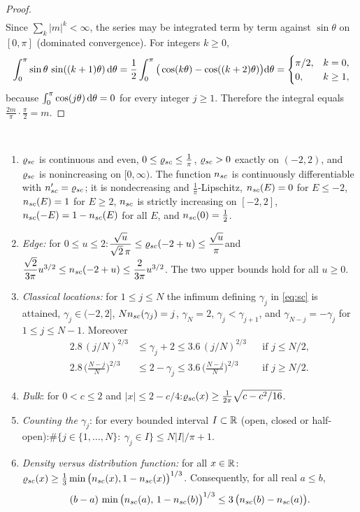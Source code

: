 \begin{proof}
\begin{align*}
\end{align*}
Since $\sum_k|m|^k<\infty$, the series may be integrated term by term against $\sin\theta$ on $[0,\pi]$ (dominated convergence). For integers $k\ge0$,
\[
 \int_0^\pi\sin\theta\,\sin((k+1)\theta)\,\mathrm{d}\theta=\frac12\int_0^\pi\big(\cos(k\theta)-\cos((k+2)\theta)\big)\mathrm{d}\theta=\begin{cases}\pi/2,&k=0,\\0,&k\ge1,\end{cases}
\]
because $\int_0^\pi\cos(j\theta)\,\mathrm{d}\theta=0$ for every integer $j\ge1$. Therefore the integral equals $\frac{2m}\pi\cdot\frac\pi2=m$.
\end{proof}

\begin{lemma}\label{lem:nsc} \infra\
\begin{enumerate}[label=\textup{(\alph*)},leftmargin=2.2em,itemsep=1pt]
\item $\varrho_{sc}$ is continuous and even, $0\le\varrho_{sc}\le\frac1\pi$, $\varrho_{sc}>0$ exactly on $(-2,2)$, and $\varrho_{sc}$ is nonincreasing on $[0,\infty)$. The function $n_{sc}$ is continuously differentiable with $n_{sc}'=\varrho_{sc}$; it is
nondecreasing and $\frac1\pi$-Lipschitz, $n_{sc}(E)=0$ for $E\le-2$, $n_{sc}(E)=1$ for $E\ge2$, $n_{sc}$ is strictly increasing on $[-2,2]$, $n_{sc}(-E)=1-n_{sc}(E)$ for all $E$, and $n_{sc}(0)=\frac12$.
\item \emph{Edge:} for $0\le u\le2$:\quad $\dfrac{\sqrt u}{\sqrt2\,\pi}\le\varrho_{sc}(-2+u)\le\dfrac{\sqrt u}{\pi}$\quad and\quad $\dfrac{\sqrt2}{3\pi}u^{3/2}\le n_{sc}(-2+u)\le\dfrac{2}{3\pi}u^{3/2}$.
The two upper bounds hold for all $u\ge0$.
\item \emph{Classical locations:} for $1\le j\le N$ the infimum defining $\gamma_j$ in \eqref{eq:sc} is attained, $\gamma_j\in(-2,2]$, $Nn_{sc}(\gamma_j)=j$, $\gamma_N=2$, $\gamma_j<\gamma_{j+1}$, and $\gamma_{N-j}=-\gamma_j$ for $1\le j\le N-1$. Moreover
\begin{align*}
 2.8\,(j/N)^{2/3}&\le\gamma_j+2\le3.6\,(j/N)^{2/3}&&\text{if }j\le N/2,\\
 2.8\,\big(\tfrac{N-j}N\big)^{2/3}&\le2-\gamma_j\le3.6\,\big(\tfrac{N-j}N\big)^{2/3}&&\text{if }j\ge N/2.
\end{align*}
\item \emph{Bulk}: for $0<c\le2$ and $|x|\le2-c/4$:\quad $\varrho_{sc}(x)\ge\frac1{2\pi}\sqrt{c-c^2/16}$.
\item \emph{Counting the $\gamma_j$}: for every bounded interval $I\subset\mathbb{R}$ (open, closed or half-open):\quad $\#\{j\in\{1,\dots,N\}:\ \gamma_j\in I\}\le N|I|/\pi+1$.
\item \emph{Density versus distribution function:} for all $x\in\mathbb{R}$:\quad $\varrho_{sc}(x)\ge\frac13\min\big(n_{sc}(x),1-n_{sc}(x)\big)^{1/3}$. Consequently, for all real $a\le b$,
\[
 (b-a)\,\min\big(n_{sc}(a),\,1-n_{sc}(b)\big)^{1/3}\le3\,\big(n_{sc}(b)-n_{sc}(a)\big).
\]
\end{enumerate}
\end{lemma}
